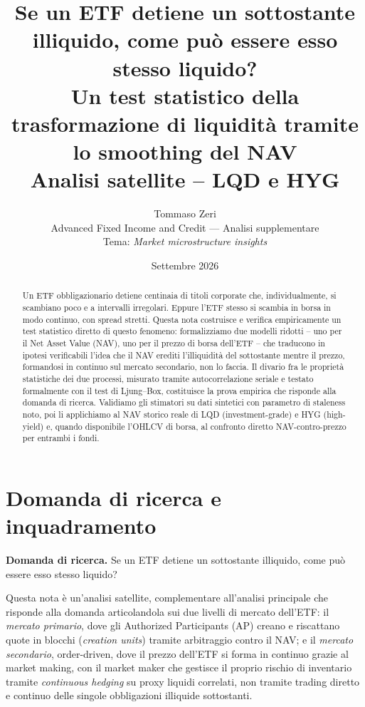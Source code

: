 \documentclass[11pt]{article}
\title{\Large Se un ETF detiene un sottostante illiquido, come pu\`o essere esso stesso liquido?\\[4pt]
\large Un test statistico della trasformazione di liquidit\`a tramite lo smoothing del NAV\\[2pt]
\normalsize Analisi satellite -- LQD e HYG}
\author{Tommaso Zeri \\ \small Advanced Fixed Income and Credit --- Analisi supplementare \\ \small Tema: \emph{Market microstructure insights}}
\date{Settembre 2026}
\begin{document}
\maketitle

\begin{abstract}
\noindent Un ETF obbligazionario detiene centinaia di titoli corporate che, individualmente, si scambiano poco e a intervalli irregolari. Eppure l'ETF stesso si scambia in borsa in modo continuo, con spread stretti. Questa nota costruisce e verifica empiricamente un test statistico diretto di questo fenomeno: formalizziamo due modelli ridotti -- uno per il Net Asset Value (NAV), uno per il prezzo di borsa dell'ETF -- che traducono in ipotesi verificabili l'idea che il NAV erediti l'illiquidit\`a del sottostante mentre il prezzo, formandosi in continuo sul mercato secondario, non lo faccia. Il divario fra le propriet\`a statistiche dei due processi, misurato tramite autocorrelazione seriale e testato formalmente con il test di Ljung--Box, costituisce la prova empirica che risponde alla domanda di ricerca. Validiamo gli stimatori su dati sintetici con parametro di staleness noto, poi li applichiamo al NAV storico reale di LQD (investment-grade) e HYG (high-yield) e, quando disponibile l'OHLCV di borsa, al confronto diretto NAV-contro-prezzo per entrambi i fondi.
\end{abstract}

\section{Domanda di ricerca e inquadramento}
\label{sec:rq}

\textbf{Domanda di ricerca.} Se un ETF detiene un sottostante illiquido, come pu\`o essere esso stesso liquido?

Questa nota \`e un'analisi satellite, complementare all'analisi principale che risponde alla domanda articolandola sui due livelli di mercato dell'ETF: il \emph{mercato primario}, dove gli Authorized Participants (AP) creano e riscattano quote in blocchi (\emph{creation units}) tramite arbitraggio contro il NAV; e il \emph{mercato secondario}, order-driven, dove il prezzo dell'ETF si forma in continuo grazie al market making, con il market maker che gestisce il proprio rischio di inventario tramite \emph{continuous hedging} su proxy liquidi correlati, non tramite trading diretto e continuo delle singole obbligazioni illiquide sottostanti.
\end{document}
